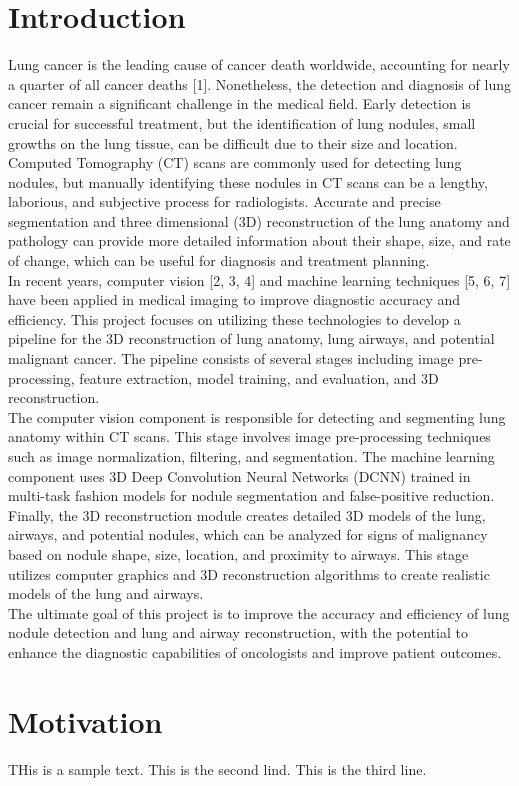 \documentclass[12pt]{article}
\begin{document}
\section{Introduction}
Lung cancer is the leading cause of cancer death worldwide, accounting for nearly a quarter of all cancer deaths [1]. Nonetheless, the detection and diagnosis of lung cancer remain a significant challenge in the medical field. Early detection is crucial for successful treatment, but the identification of lung nodules, small growths on the lung tissue, can be difficult due to their size and location.  \\
Computed Tomography (CT) scans are commonly used for detecting lung nodules, but manually identifying these nodules in CT scans can be a lengthy, laborious, and subjective process for radiologists. Accurate and precise segmentation and three dimensional (3D) reconstruction of the lung anatomy and pathology can provide more detailed information about their shape, size, and rate of change, which can be useful for diagnosis and treatment planning. \\
In recent years, computer vision [2, 3, 4] and machine learning techniques [5, 6, 7] have been applied in medical imaging to improve diagnostic accuracy and efficiency. This project focuses on utilizing these technologies to develop a pipeline for the 3D reconstruction of lung anatomy, lung airways, and potential malignant cancer. The pipeline consists of several stages including image pre-processing, feature extraction, model training, and evaluation, and 3D reconstruction.\\
The computer vision component is responsible for detecting and segmenting lung anatomy within CT scans. This stage involves image pre-processing techniques such as image normalization, filtering, and segmentation. The machine learning component uses 3D Deep Convolution Neural Networks (DCNN) trained in multi-task fashion models for nodule segmentation and false-positive reduction. \\
Finally, the 3D reconstruction module creates detailed 3D models of the lung, airways, and potential nodules, which can be analyzed for signs of malignancy based on nodule shape, size, location, and proximity to airways. This stage utilizes computer graphics and 3D reconstruction algorithms to create realistic models of the lung and airways. \\
The ultimate goal of this project is to improve the accuracy and efficiency of lung nodule detection and lung and airway reconstruction, with the potential to enhance the diagnostic capabilities of oncologists and improve patient outcomes.


\section{Motivation}
THis is a sample text.
This is the second lind.
This is the third line.
\end{document}
